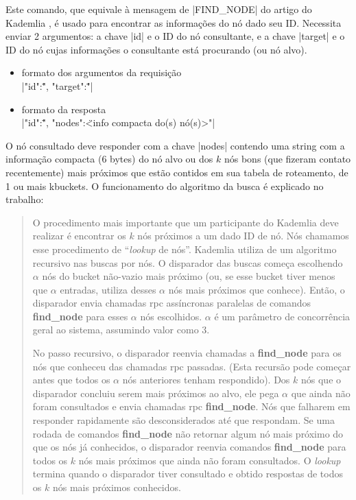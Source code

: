 
\newpage
{}

Este comando, que equivale à mensagem de \bverb|FIND\_NODE| do artigo do Kademlia
\cite{artigo:kademlia}, é usado para encontrar as informações do nó dado seu ID.
Necessita enviar 2 argumentos: a chave \bverb|id| e o ID do nó consultante, e a chave
\bverb|target| e o ID do nó cujas informações o consultante está procurando (ou nó
alvo).

\begin{itemize}
    \item formato dos argumentos da requisição \\
        \sverb|{"id":\"<IDs dos nós consultantes>", "target":\"<ID do nó alvo>"}|

    \item formato da resposta \\
        \sverb|{"id":\"<IDs dos nós consultados>", "nodes":\"<info compacta do(s) nó(s)>"}|
\end{itemize}

O nó consultado deve responder com a chave \bverb|nodes| contendo uma
\gls*{string} com a informação compacta (6 bytes) do nó alvo ou dos $k$ nós bons (que
fizeram contato recentemente) mais próximos que estão contidos em sua tabela de
roteamento, de 1 ou mais \glspl*{kbucket}. O funcionamento do algoritmo da busca é
explicado no trabalho:

\blockquote{O procedimento mais importante que um participante do Kademlia deve realizar
é encontrar os $k$ nós próximos a um dado ID de nó. Nós chamamos esse procedimento de
\enquote{\emph{lookup} de nós}. Kademlia utiliza de um algoritmo recursivo nas buscas
por nós. O disparador das buscas começa escolhendo $\alpha$ nós do \gls*{bucket}
não-vazio mais próximo (ou, se esse \gls*{bucket} tiver menos que $\alpha$ entradas,
utiliza desses $\alpha$ nós mais próximos que conhece). Então, o disparador envia
chamadas \gls*{rpc} assíncronas paralelas de comandos \textbf{find\_node} para esses
$\alpha$ nós escolhidos. $\alpha$ é um parâmetro de concorrência geral ao sistema,
assumindo valor como 3.

No passo recursivo, o disparador reenvia chamadas a \textbf{find\_node} para os nós que
conheceu das chamadas \gls*{rpc} passadas. (Esta recursão pode começar antes que todos
os $\alpha$ nós anteriores tenham respondido). Dos $k$ nós que o disparador concluiu
serem mais próximos ao alvo, ele pega $\alpha$ que ainda não foram consultados e envia
chamadas \gls*{rpc} \textbf{find\_node}. Nós que falharem em responder rapidamente são
desconsiderados até que respondam. Se uma rodada de comandos \textbf{find\_node} não
retornar algum nó mais próximo do que os nós já conhecidos, o disparador reenvia
comandos \textbf{find\_node} para todos os $k$ nós mais próximos que ainda não foram
consultados. O \emph{lookup} termina quando o disparador tiver consultado e obtido
respostas de todos os $k$ nós mais próximos conhecidos.}

